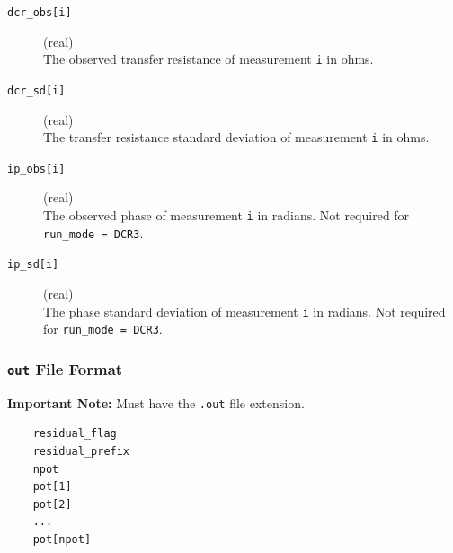 \documentclass[a4paper,12pt]{article}
\begin{document}
\begin{description}
    \item[\texttt{dcr\_obs[i]}] (real)\hfill \\
    The observed transfer resistance of measurement \texttt{i} in ohms.

    \item[\texttt{dcr\_sd[i]}] (real)\hfill \\
    The transfer resistance standard deviation of measurement \texttt{i} in ohms.

    \item[\texttt{ip\_obs[i]}] (real)\hfill \\
    The observed phase of measurement \texttt{i} in radians. Not required for \texttt{run\_mode = DCR3}.

    \item[\texttt{ip\_sd[i]}] (real)\hfill \\
    The phase standard deviation of measurement \texttt{i} in radians. Not required for \texttt{run\_mode = DCR3}.
\end{description}


\newpage
\subsubsection{\texttt{out} File Format} \label{forward_out}

\begin{framed}
\noindent \textbf{Important Note:} Must have the \texttt{.out} file extension.
\end{framed}

\begin{framed}
\begin{verbatim}
    residual_flag
    residual_prefix
    npot
    pot[1]
    pot[2]
    ...
    pot[npot]
\end{verbatim}
\end{framed}
\end{document}
